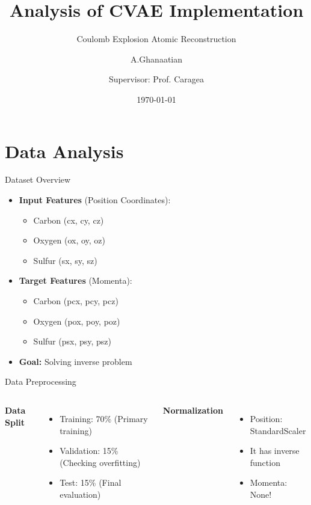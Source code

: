 \documentclass{beamer}
\title{Analysis of CVAE Implementation}
\subtitle{Coulomb Explosion Atomic Reconstruction}
\author{A.Ghanaatian\and Supervisor: Prof. Caragea}
\date{\today}
\begin{document}
\begin{frame}
    \titlepage
\end{frame}

\section{Data Analysis}

\begin{frame}{Dataset Overview}
    \begin{itemize}
        \item \textbf{Input Features} (Position Coordinates):
        \begin{itemize}
            \item Carbon (cx, cy, cz)
            \item Oxygen (ox, oy, oz)
            \item Sulfur (sx, sy, sz)
        \end{itemize}
        \item \textbf{Target Features} (Momenta):
        \begin{itemize}
            \item Carbon (pcx, pcy, pcz)
            \item Oxygen (pox, poy, poz)
            \item Sulfur (psx, psy, psz)
        \end{itemize}
        \item \textbf{Goal:} Solving inverse problem
    \end{itemize}
\end{frame}

\begin{frame}{Data Preprocessing}
    \begin{columns}
        \textbf{Data Split}
        \begin{itemize}
            \item Training: 70\% (Primary training)
            \item Validation: 15\% (Checking overfitting)
            \item Test: 15\% (Final evaluation)
        \end{itemize}
        
        \textbf{Normalization}
        \begin{itemize}
            \item Position: StandardScaler
            \item It has inverse function
            \item Momenta: None!
        \end{itemize}
    \end{columns}
\end{frame}
\end{document}
